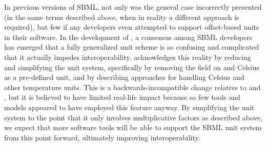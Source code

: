 In previous versions of SBML, not only was the general case
incorrectly presented (\ie in the same terms described above, when
in reality a different approach is required), but few if any
developers even attempted to support offset-based units in their
software.  In the development of \sbmltwotwo, a consensus among
SBML developers has emerged that a fully generalized unit scheme
is so confusing and complicated that it actually impedes
interoperability.  \twotwo acknowledges this reality by reducing
and simplifying the unit system, specifically by removing the
 field on \Unit and Celsius as a pre-defined unit,
and by describing approaches for handling Celsius and other
temperature units.  This is a backwards-incompatible change
relative to \sbmltwoone and \sbmlonetwo, but it is believed to
have limited real-life impact because so few tools and models
appeared to have employed this feature anyway.  By simplifying the
unit system to the point that it only involves multiplicative
factors as described above, we expect that more software tools
will be able to support the SBML unit system from this point
forward, ultimately improving interoperability.

